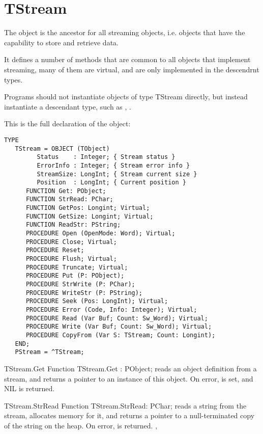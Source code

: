 
\section{TStream}
\label{se:TStream}

The  object is the ancestor for all streaming objects, i.e.
objects that have the capability to store and retrieve data.

It defines a number of methods that are common to all objects that implement
streaming, many of them are virtual, and are only implemented in the
descendrnt types.

Programs should not instantiate objects of type TStream directly, but
instead instantiate a descendant type, such as ,
.

This is the full declaration of the  object:
\begin{verbatim}
TYPE
   TStream = OBJECT (TObject)
         Status    : Integer; { Stream status }
         ErrorInfo : Integer; { Stream error info }
         StreamSize: LongInt; { Stream current size }
         Position  : LongInt; { Current position }
      FUNCTION Get: PObject;
      FUNCTION StrRead: PChar;
      FUNCTION GetPos: Longint; Virtual;
      FUNCTION GetSize: Longint; Virtual;
      FUNCTION ReadStr: PString;
      PROCEDURE Open (OpenMode: Word); Virtual;
      PROCEDURE Close; Virtual;
      PROCEDURE Reset;
      PROCEDURE Flush; Virtual;
      PROCEDURE Truncate; Virtual;
      PROCEDURE Put (P: PObject);
      PROCEDURE StrWrite (P: PChar);
      PROCEDURE WriteStr (P: PString);
      PROCEDURE Seek (Pos: LongInt); Virtual;
      PROCEDURE Error (Code, Info: Integer); Virtual;
      PROCEDURE Read (Var Buf; Count: Sw_Word); Virtual;
      PROCEDURE Write (Var Buf; Count: Sw_Word); Virtual;
      PROCEDURE CopyFrom (Var S: TStream; Count: Longint);
   END;
   PStream = ^TStream;
\end{verbatim}

\begin{function}{TStream.Get}
\Declaration
Function TStream.Get : PObject;
\Description
{} reads an object definition  from a stream, and returns
a pointer to an instance of this object.
\Errors
On error,  is set, and NIL is returned.
\SeeAlso 
{}
\end{function}


\begin{function}{TStream.StrRead}
\Declaration
Function TStream.StrRead: PChar;
\Description
{} reads a string from the stream, allocates memory
for it, and returns a pointer to a null-terminated copy of the string
on the heap.
\Errors
On error,  is returned.
\SeeAlso
{}, 
\end{function}


